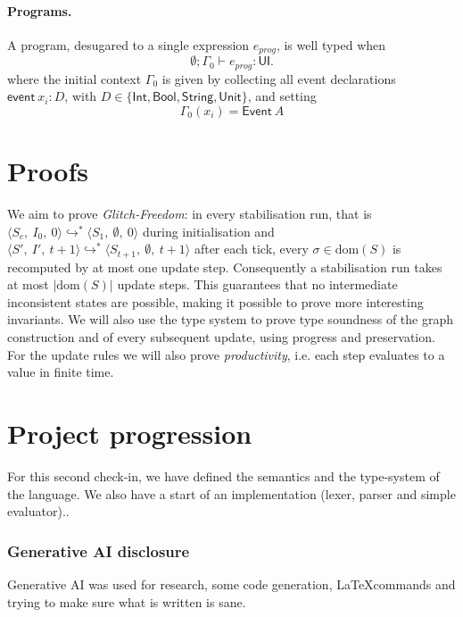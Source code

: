 \documentclass{article}
\newcommand{\kw}[1]{\mathsf{#1}}
\newcommand{\cfg}[3]{\langle #1,\ #2,\ #3\rangle}
\newcommand{\ustar}{\hookrightarrow^{*}}
\begin{document}
\paragraph{Programs.} A program, desugared to a single expression $e_{\mathit{prog}}$, is well typed when
\[ \emptyset;\Gamma_0 \vdash e_{\mathit{prog}} : \kw{UI}. \]
where the initial context $ \Gamma_0 $ is given by collecting all event declarations $ \kw{event}\ x_i : D $, with $D \in \{\kw{Int},\kw{Bool},\kw{String},\kw{Unit}\}$, and setting
\[
  \Gamma_0(x_i) = \kw{Event}\ A
\]

\section{Proofs}
We aim to prove \textit{Glitch-Freedom}: in every stabilisation run, that is $\cfg{S_c}{I_0}{0} \ustar \cfg{S_1}{\emptyset}{0}$ during initialisation and $\cfg{S'}{I'}{t+1} \ustar \cfg{S_{t+1}}{\emptyset}{t+1}$ after each tick, every $\sigma \in \mathrm{dom}(S)$ is recomputed by at most one update step. Consequently a stabilisation run takes at most $|\mathrm{dom}(S)|$ update steps. This guarantees that no intermediate inconsistent states are possible, making it possible to prove more interesting invariants. We will also use the type system to prove type soundness of the graph construction and of every subsequent update, using progress and preservation. For the update rules we will also prove \textit{productivity}, i.e. each step evaluates to a value in finite time.

\section{Project progression}

For this second check-in, we have defined the semantics and the type-system of the language. We also have a start of an implementation (lexer, parser and simple evaluator)..

\subsubsection*{Generative AI disclosure}

Generative AI was used for research, some code generation, \LaTeX \space commands and trying to make sure what is written is sane.

\printbibliography
\end{document}
